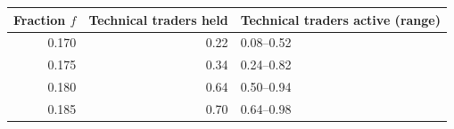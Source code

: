 \begin{center}
\begin{minipage}{\linewidth}
\centering
\captionsetup{type=table,hypcap=false}

\end{minipage}
\end{center}

\begin{center}
\begin{minipage}{\linewidth}\centering
\captionsetup{type=table,hypcap=false}
\caption{Probability of a Sell majority after changes in trader cash and shares,
over 50 starting markets. Each fraction includes 27 combinations of
cash, shares, and dealer capacity. Keeping the technical traders in Hold
gave the same probability for all combinations; allowing them to trade on
the price gave the stated range.}
\label{tab:balance-fractions}
\small
\begin{tabular}{rrl}
\toprule
Fraction $f$ & Technical traders held & Technical traders active (range) \\
\midrule
0.170 & 0.22 & 0.08--0.52 \\
0.175 & 0.34 & 0.24--0.82 \\
0.180 & 0.64 & 0.50--0.94 \\
0.185 & 0.70 & 0.64--0.98 \\
\bottomrule
\end{tabular}
\end{minipage}
\end{center}




